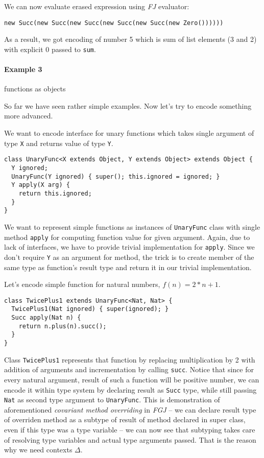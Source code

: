 \documentclass{article}[12pt]
\begin{document}
We can now evaluate erased expression using \emph{FJ} evaluator:

\begin{verbatim}
new Succ(new Succ(new Succ(new Succ(new Succ(new Zero())))))
\end{verbatim}

As a result, we got encoding of number 5 which is sum of list
elements (3 and 2) with explicit 0 passed to \texttt{sum}.

\paragraph{Example 3} functions as objects

So far we have seen rather simple examples. Now let's try to
encode something more advanced.

We want to encode interface for unary functions which takes
single argument of type \texttt{X} and returns value
of type \texttt{Y}.

\begin{verbatim}
class UnaryFunc<X extends Object, Y extends Object> extends Object {
  Y ignored;
  UnaryFunc(Y ignored) { super(); this.ignored = ignored; }
  Y apply(X arg) {
    return this.ignored;
  }
}
\end{verbatim}

We want to represent simple functions as instances of
\texttt{UnaryFunc} class with single method \texttt{apply} for
computing function value for given argument. Again, due to lack
of interfaces, we have to provide trivial implementation for
\texttt{apply}. Since we don't require \texttt{Y} as an argument
for method, the trick is to create member of the same type as
function's result type and return it in our trivial implementation.

Let's encode simple function for natural numbers, $f(n) = 2 * n + 1$.

\begin{verbatim}
class TwicePlus1 extends UnaryFunc<Nat, Nat> {
  TwicePlus1(Nat ignored) { super(ignored); }
  Succ apply(Nat n) {
    return n.plus(n).succ();
  }
}
\end{verbatim}

Class \texttt{TwicePlus1} represents that function by replacing
multiplication by 2 with addition of arguments and incrementation
by calling \texttt{succ}. Notice that since for every natural argument,
result of such a function will be positive number, we can encode it
within type system by declaring result as \texttt{Succ} type, while
still passing \texttt{Nat} as second type argument to
\texttt{UnaryFunc}. This is demonstration of aforementioned
\emph{covariant method overriding} in \emph{FGJ} -- we can declare
result type of overriden method as a subtype of result of method
declared in super class, even if this type was a type variable --
we can now see that subtyping takes care of resolving type variables
and actual type arguments passed. That is the reason why we need
contexts $\Delta$.
\end{document}
